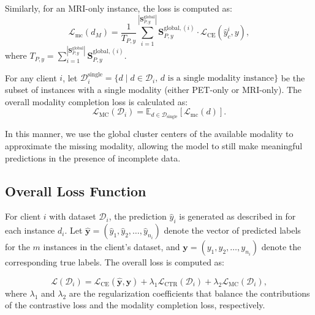 Similarly, for an MRI-only instance, the loss is computed as:
\begin{equation}
\mathcal{L}_{\text{mc}}(d_M) =  \frac{1}{T_{P,y}} \sum_{i=1}^{|\mathbf{S}_{P,y}^{\text{global}}|} \mathbf{S}_{P,y}^{\text{global},(i)} \cdot \mathcal{L}_{\text{CE}}(\hat{y}_c^i, y),
\end{equation}
where \( T_{P,y} = \sum_{i=1}^{|\mathbf{S}_{P,y}^{\text{global}}|} \mathbf{S}_{P,y}^{\text{global},(i)} \).

For any client $i$, let \( \mathcal{D}_i^{\text{single}} = \{ d \mid d \in \mathcal{D}_i, \, d \text{ is a single modality instance} \} \) be the subset of instances with a single modality (either PET-only or MRI-only). The overall modality completion loss is calculated as:
\begin{equation}
    \mathcal{L}_{\text{MC}}(\mathcal{D}_i)=\mathbb{E}_{d\in\mathcal{D}_{\text{single}}}\left[\mathcal{L}_{\text{mc}}(d)\right].
\end{equation}

In this manner, we use the global cluster centers of the available modality to approximate the missing modality, allowing the model to still make meaningful predictions in the presence of incomplete data.



\subsection{Overall Loss Function}

For client \( i \) with dataset \( \mathcal{D}_i \), the prediction \( \hat{y}_i \) is generated as described in  for each instance \( d_i \). Let \( \hat{\mathbf{y}} = (\hat{y}_1, \hat{y}_2, \dots, \hat{y}_{n_i}) \) denote the vector of predicted labels for the \( m \) instances in the client's dataset, and \( \mathbf{y} = (y_1, y_2, \dots, y_{n_i}) \) denote the corresponding true labels. The overall loss is computed as:

\begin{equation}
\mathcal{L}(\mathcal{D}_i) = \mathcal{L}_{\text{CE}}(\hat{\mathbf{y}}, \mathbf{y}) + \lambda_1 \mathcal{L}_{\text{CTR}}(\mathcal{D}_i) + \lambda_2 \mathcal{L}_{\text{MC}}(\mathcal{D}_i),
\end{equation}
where \( \lambda_1 \) and \( \lambda_2 \) are the regularization coefficients that balance the contributions of the contrastive loss and the modality completion loss, respectively.



